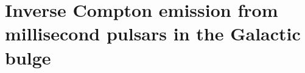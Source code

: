 \documentclass[doublespace,nopageskip]{VTthesis} %
\newcommand{\mrm}[1]{\mathrm{#1}}
\begin{document}




\chapter{Inverse Compton emission from millisecond pulsars in the Galactic bulge} \label{ch:IC_MSPs}
\end{document}
